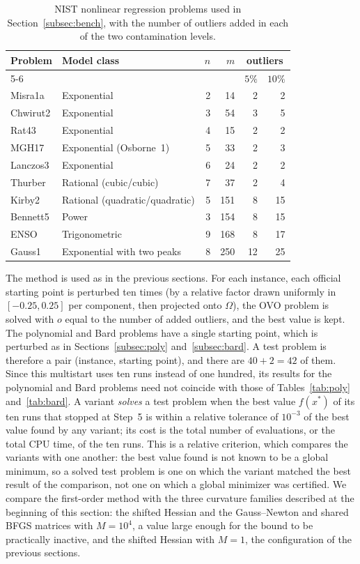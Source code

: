 \documentclass[11pt]{article}
\begin{document}
\begin{table}[ht!]
\centering
\small
\begin{tabular}{llrrrr}
\hline
Problem & Model class & $n$ & $m$ & \multicolumn{2}{c}{outliers} \\
\cline{5-6}
 & & & & $5\%$ & $10\%$ \\
\hline
Misra1a  & Exponential                  & 2 &  14 &  2 &  2 \\
Chwirut2 & Exponential                  & 3 &  54 &  3 &  5 \\
Rat43    & Exponential                  & 4 &  15 &  2 &  2 \\
MGH17    & Exponential (Osborne~1)      & 5 &  33 &  2 &  3 \\
Lanczos3 & Exponential                  & 6 &  24 &  2 &  2 \\
Thurber  & Rational (cubic/cubic)       & 7 &  37 &  2 &  4 \\
Kirby2   & Rational (quadratic/quadratic) & 5 & 151 &  8 & 15 \\
Bennett5 & Power                        & 3 & 154 &  8 & 15 \\
ENSO     & Trigonometric                & 9 & 168 &  8 & 17 \\
Gauss1   & Exponential with two peaks   & 8 & 250 & 12 & 25 \\
\hline
\end{tabular}
\caption{NIST nonlinear regression problems used in Section~\ref{subsec:bench},
with the number of outliers added in each of the two contamination levels.}
\label{tab:nist}
\end{table}

The method is used as in the previous sections. For each instance, each
official starting point is perturbed ten times (by a relative factor drawn
uniformly in $[-0.25, 0.25]$ per component, then projected onto $\Omega$), the
OVO problem is solved with $o$ equal to the number of added outliers, and the
best value is kept. The polynomial and Bard problems have a single starting
point, which is perturbed as in Sections~\ref{subsec:poly}
and~\ref{subsec:bard}. A test problem is therefore a pair (instance, starting
point), and there are $40 + 2 = 42$ of them. Since this multistart uses ten
runs instead of one hundred, its results for the polynomial and Bard problems
need not coincide with those of Tables~\ref{tab:poly} and~\ref{tab:bard}. A variant \emph{solves} a test problem when
the best value $f(x^*)$ of its ten runs that stopped at Step~5 is within a
relative tolerance of $10^{-3}$ of the best value found by any variant; its
cost is the total number of evaluations, or the total CPU time, of the ten
runs. This is a relative criterion, which compares the variants with one
another: the best value found is not known to be a global minimum, so a solved
test problem is one on which the variant matched the best result of the
comparison, not one on which a global minimizer was certified. We compare the first-order method with the three curvature families
described at the beginning of this section: the shifted Hessian and the
Gauss--Newton and shared BFGS matrices with $M = 10^4$, a value large enough
for the bound to be practically inactive, and the shifted Hessian with $M = 1$,
the configuration of the previous sections.
\end{document}

